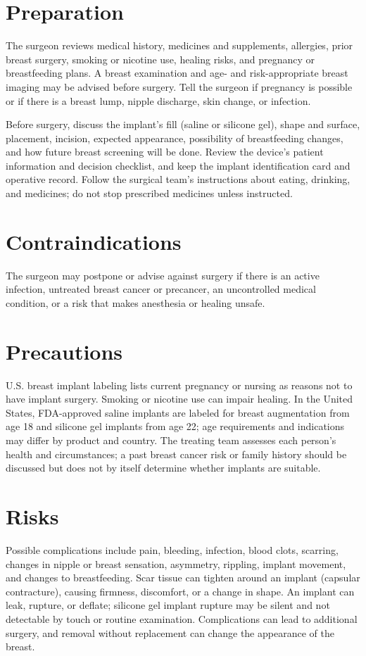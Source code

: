 \section*{Preparation}
The surgeon reviews medical history, medicines and supplements, allergies, prior breast surgery, smoking or nicotine use, healing risks, and pregnancy or breastfeeding plans. A breast examination and age- and risk-appropriate breast imaging may be advised before surgery. Tell the surgeon if pregnancy is possible or if there is a breast lump, nipple discharge, skin change, or infection.

Before surgery, discuss the implant's fill (saline or silicone gel), shape and surface, placement, incision, expected appearance, possibility of breastfeeding changes, and how future breast screening will be done. Review the device's patient information and decision checklist, and keep the implant identification card and operative record. Follow the surgical team's instructions about eating, drinking, and medicines; do not stop prescribed medicines unless instructed.

\section*{Contraindications}
The surgeon may postpone or advise against surgery if there is an active infection, untreated breast cancer or precancer, an uncontrolled medical condition, or a risk that makes anesthesia or healing unsafe.

\section*{Precautions}
U.S. breast implant labeling lists current pregnancy or nursing as reasons not to have implant surgery. Smoking or nicotine use can impair healing. In the United States, FDA-approved saline implants are labeled for breast augmentation from age 18 and silicone gel implants from age 22; age requirements and indications may differ by product and country. The treating team assesses each person's health and circumstances; a past breast cancer risk or family history should be discussed but does not by itself determine whether implants are suitable.

\section*{Risks}
Possible complications include pain, bleeding, infection, blood clots, scarring, changes in nipple or breast sensation, asymmetry, rippling, implant movement, and changes to breastfeeding. Scar tissue can tighten around an implant (capsular contracture), causing firmness, discomfort, or a change in shape. An implant can leak, rupture, or deflate; silicone gel implant rupture may be silent and not detectable by touch or routine examination. Complications can lead to additional surgery, and removal without replacement can change the appearance of the breast.

